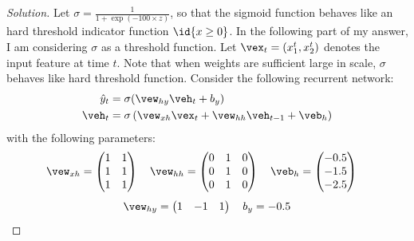 \documentclass{article}
\begin{document}
	\begin{proof}[Solution]
		Let $\sigma = \frac{1}{1 + \exp(-100\times z)}$, so that the sigmoid function behaves like an hard threshold indicator function $\id{x \geq 0}$. In the following part of my answer, I am considering $\sigma$ as a threshold function.
		Let $\vex_t = (x_1^t, x_2^t)$ denotes the input feature at time $t$. Note that when weights are sufficient large in scale, $\sigma$ behaves like hard threshold function.
		Consider the following recurrent network:
		\begin{align}
			\hat{y}_t &= \sigma(\vew_{hy} \veh_t + b_y)\\
			\veh_t &= \sigma\left(
				\vew_{xh} \vex_t
				+ \vew_{hh} \veh_{t-1}
				+ \veb_h
			\right)
		\end{align}
		with the following parameters:
		\begin{align}
			\vew_{xh} &= 
			\begin{pmatrix}
				 1 & 1 \\
				 1 & 1 \\
				 1 & 1
			\end{pmatrix}
			\quad
			\vew_{hh} = 
			\begin{pmatrix}
				0 & 1 & 0 \\
				0 & 1 & 0 \\
				0 & 1 & 0
			\end{pmatrix}
			\quad
			\veb_h = \begin{pmatrix}
				-0.5 \\ -1.5 \\ -2.5
			\end{pmatrix}
		\end{align}
		\begin{align}
			\vew_{hy} = 
			\begin{pmatrix}
				1 & -1 & 1
			\end{pmatrix}
			\quad
			b_y = -0.5
		\end{align}
		

\end{proof}
\end{document}
